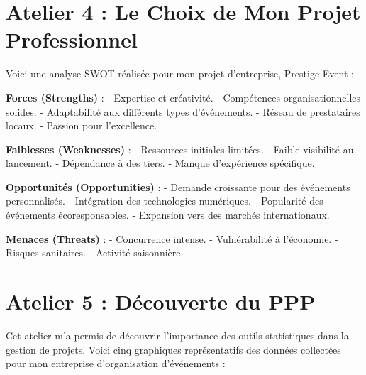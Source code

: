\documentclass[a4paper,12pt]{article}
\begin{document}
\section*{\color{mygreen} Atelier 4 : Le Choix de Mon Projet Professionnel}
Voici une analyse SWOT réalisée pour mon projet d'entreprise, Prestige Event :  

\bigskip
\textbf{\color{myblue} Forces (Strengths)} :  
- Expertise et créativité.  
- Compétences organisationnelles solides.  
- Adaptabilité aux différents types d'événements.  
- Réseau de prestataires locaux.  
- Passion pour l'excellence.  

\bigskip
\textbf{\color{myblue} Faiblesses (Weaknesses)} :  
- Ressources initiales limitées.  
- Faible visibilité au lancement.  
- Dépendance à des tiers.  
- Manque d'expérience spécifique.  

\bigskip
\textbf{\color{myblue} Opportunités (Opportunities)} :  
- Demande croissante pour des événements personnalisés.  
- Intégration des technologies numériques.  
- Popularité des événements écoresponsables.  
- Expansion vers des marchés internationaux.  

\bigskip
\textbf{\color{myblue} Menaces (Threats)} :  
- Concurrence intense.  
- Vulnérabilité à l'économie.  
- Risques sanitaires.  
- Activité saisonnière.  

\section*{\color{mygreen} Atelier 5 : Découverte du PPP}
Cet atelier m'a permis de découvrir l'importance des outils statistiques dans la gestion de projets. Voici cinq graphiques représentatifs des données collectées pour mon entreprise d'organisation d'événements :  
\end{document}
